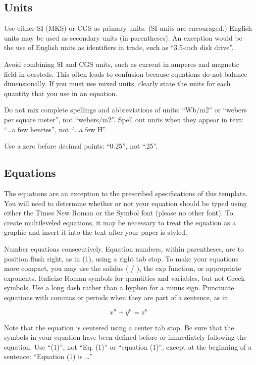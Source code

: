 \documentclass[conference,flushend]{iaria-lite}
\begin{document}
\subsection{Units}
\begin{compactitem}
\item Use either SI (MKS) or CGS as primary units. (SI units are encouraged.) English units may be used as secondary units (in parentheses). An exception would be the use of English units as identifiers in trade, such as “3.5-inch disk drive”.
\item Avoid combining SI and CGS units, such as current in amperes and magnetic field in oersteds. This often leads to confusion because equations do not balance dimensionally. If you must use mixed units, clearly state the units for each quantity that you use in an equation.
\item Do not mix complete spellings and abbreviations of units: “Wb/m2” or “webers per square meter”, not “webers/m2”.  Spell out units when they appear in text: “\ldots a few henries”, not “\ldots a few H”.
\item Use a zero before decimal points: “0.25”, not “.25”.
\end{compactitem}

\subsection{Equations}

The equations are an exception to the prescribed specifications of this template. You will need to determine whether or not your equation should be typed using either the Times New Roman or the Symbol font (please no other font). To create multileveled equations, it may be necessary to treat the equation as a graphic and insert it into the text after your paper is styled.

Number equations consecutively. Equation numbers, within parentheses, are to position flush right, as in (1), using a right tab stop. To make your equations more compact, you may use the solidus ( / ), the exp function, or appropriate exponents. Italicize Roman symbols for quantities and variables, but not Greek symbols. Use a long dash rather than a hyphen for a minus sign. Punctuate equations with commas or periods when they are part of a sentence, as in

\[ x^n + y^n = z^n \]

Note that the equation is centered using a center tab stop. Be sure that the symbols in your equation have been defined before or immediately following the equation. Use “(1)”, not “Eq. (1)” or “equation (1)”, except at the beginning of a sentence: “Equation (1) is \ldots”
\end{document}
